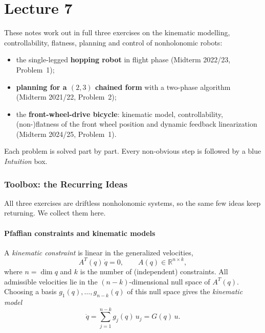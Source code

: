 \documentclass[11pt,a4paper]{article}
\def\boldsymbol#1{#1}%
\newcommand{\R}{\mathbb{R}}
\newcommand{\q}{\boldsymbol{q}}
\newcommand{\g}{\boldsymbol{g}}
\theoremstyle{definition}
\theoremstyle{plain}
\theoremstyle{remark}
\begin{document}
\part{Lecture 7}

\noindent These notes work out in full three exercises on the kinematic modelling, controllability, flatness, planning and control of nonholonomic robots:
\begin{itemize}[nosep]
  \item the single-legged \textbf{hopping robot} in flight phase (Midterm 2022/23, Problem~1);
  \item \textbf{planning for a $(2,3)$ chained form} with a two-phase algorithm (Midterm 2021/22, Problem~2);
  \item the \textbf{front-wheel-drive bicycle}: kinematic model, controllability, (non-)flatness of the front wheel position and dynamic feedback linearization (Midterm 2024/25, Problem~1).
\end{itemize}
Each problem is solved part by part. Every non-obvious step is followed by a blue \emph{Intuition} box.

\section{Toolbox: the Recurring Ideas}
\label{sec:toolbox}

All three exercises are driftless nonholonomic systems, so the same few ideas keep returning. We collect them here.

\subsection{Pfaffian constraints and kinematic models}

A \emph{kinematic constraint} is linear in the generalized velocities,
\begin{equation}
  A^T(\q)\,\dot\q = 0, \qquad A(\q)\in\R^{n\times k},
\end{equation}
where $n=\dim\q$ and $k$ is the number of (independent) constraints. All admissible velocities lie in the $(n-k)$-dimensional null space of $A^T(\q)$. Choosing a basis $\g_1(\q),\dots,\g_{n-k}(\q)$ of this null space gives the \emph{kinematic model}
\begin{equation}
  \dot\q=\sum_{j=1}^{n-k}\g_j(\q)\,u_j = G(\q)\,u .
\end{equation}
\end{document}

